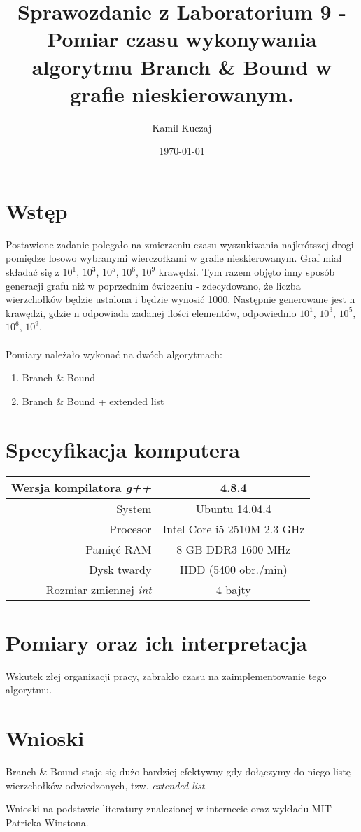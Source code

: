 \documentclass[11pt,a4paper]{article}
\author{Kamil Kuczaj}
\title{Sprawozdanie z Laboratorium 9 - Pomiar czasu wykonywania algorytmu Branch \& Bound w grafie nieskierowanym.}
\date{\today}
\begin{document}
\maketitle

\section{Wstęp}
\hspace{4ex}Postawione zadanie polegało na zmierzeniu czasu wyszukiwania najkrótszej drogi pomiędze losowo wybranymi wierczołkami w grafie nieskierowanym. Graf miał składać się z $10^1$, $10^3$, $10^5$, $10^6$, $10^9$ krawędzi. Tym razem objęto inny sposób generacji grafu niż w poprzednim ćwiczeniu - zdecydowano, że liczba wierzchołków będzie ustalona i będzie wynosić 1000. Następnie generowane jest n krawędzi, gdzie n odpowiada zadanej ilości elementów, odpowiednio $10^1$, $10^3$, $10^5$, $10^6$, $10^9$.\\\\Pomiary należało wykonać na dwóch algorytmach:
\begin{enumerate}
\item Branch \& Bound
\item Branch \& Bound + extended list
\end{enumerate}

\section{Specyfikacja komputera}

\begin{center}
	\begin{tabular}{| r | c |}
	\hline
	Wersja kompilatora \textit{g++} & 4.8.4 \\ \hline
	System & Ubuntu 14.04.4 \\ \hline
	Procesor	 & Intel Core i5 2510M 2.3 GHz \\ \hline
	Pamięć RAM & 8 GB DDR3 1600 MHz \\ \hline
	Dysk twardy & HDD (5400 obr./min) \\ \hline
	Rozmiar zmiennej \textit{int} & 4 bajty \\ \hline
	\end{tabular}
\end{center}

\section{Pomiary oraz ich interpretacja}

Wskutek złej organizacji pracy, zabrakło czasu na zaimplementowanie tego algorytmu.

\section{Wnioski}
\hspace{4ex}Branch \& Bound staje się dużo bardziej efektywny gdy dołączymy do niego listę wierzchołków odwiedzonych, tzw. \textit{extended list}.


Wnioski na podstawie literatury znalezionej w internecie oraz wykładu MIT Patricka Winstona.
\end{document}

